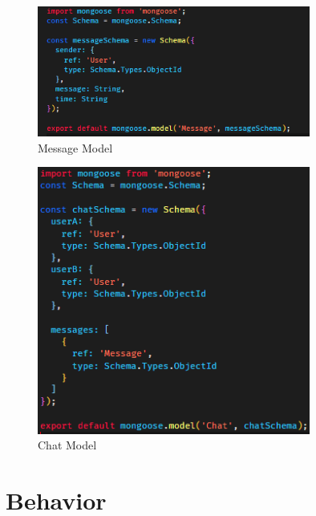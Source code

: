         \begin{figure}[h]
            \centering
            \includegraphics[width=0.8\textwidth]{images/messageModel.png}
            \caption{Message Model}
            \label{fig:messageModel}
        \end{figure}


        \begin{figure}[h]
            \centering
            \includegraphics[width=0.8\textwidth]{images/chatModel.png}
            \caption{Chat Model}
            \label{fig:chatModel}
        \end{figure}


    \pagebreak
    \clearpage

    \section{Behavior}

    \pagebreak